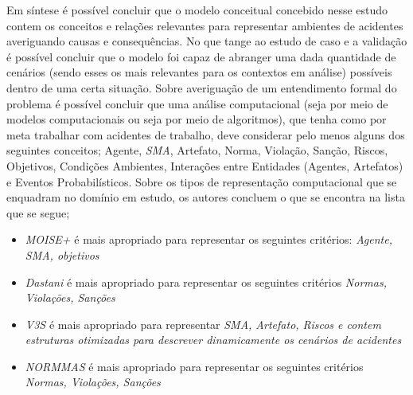 Em síntese é possível concluir que o modelo conceitual concebido nesse estudo contem os conceitos e relações relevantes para representar ambientes de acidentes averiguando causas e consequências. No que tange ao estudo de caso e a validação é possível concluir que o modelo foi capaz de abranger uma dada quantidade de cenários (sendo esses os mais relevantes para os contextos em análise) possíveis dentro de uma certa situação. Sobre averiguação de um entendimento formal do problema é possível concluir que uma análise computacional (seja por meio de modelos computacionais ou seja por meio de algoritmos), que tenha como por meta trabalhar com acidentes de trabalho, deve considerar pelo menos alguns dos seguintes conceitos; Agente, \textit{SMA}, Artefato, Norma, Violação, Sanção, Riscos, Objetivos, Condições Ambientes, Interações entre Entidades (Agentes, Artefatos) e Eventos Probabilísticos. Sobre os tipos de representação computacional que se enquadram no domínio em estudo, os autores concluem o que se encontra na lista que se segue;
\begin{itemize}
    \item \textit{MOISE+} é mais apropriado para representar os seguintes critérios: \textit{Agente, SMA, objetivos}
    \item \textit{Dastani} é mais apropriado para representar os seguintes critérios \textit{Normas, Violações, Sanções} 
    \item \textit{V3S} é mais apropriado para representar \textit{SMA, Artefato, Riscos e contem estruturas otimizadas para descrever dinamicamente os cenários de acidentes}
    \item \textit{NORMMAS} é mais apropriado para representar os seguintes critérios \textit{Normas, Violações, Sanções}
\end{itemize}